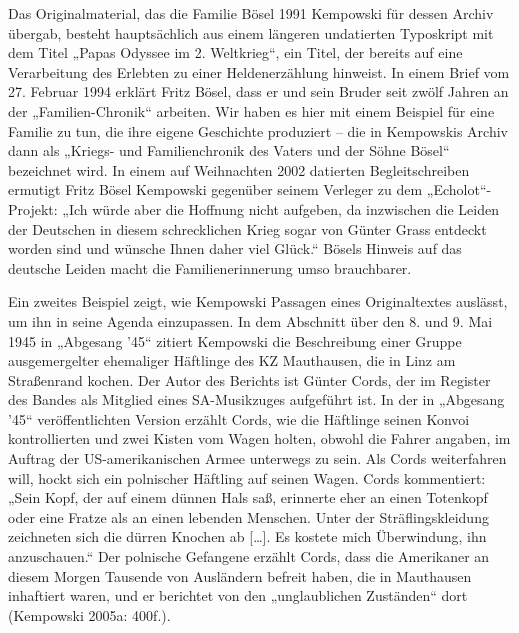 \begin{multicols*}{2}
Das Originalmaterial, das die Familie Bösel 1991 Kempowski für dessen Archiv übergab, besteht hauptsächlich aus einem längeren undatierten Typoskript mit dem Titel „Papas Odyssee im 2. Weltkrieg“, ein Titel, der bereits auf eine Verarbeitung des Erlebten zu einer Heldenerzählung hinweist. In einem Brief vom 27. Februar 1994 erklärt Fritz Bösel, dass er und sein Bruder seit zwölf Jahren an der „Familien-Chronik“ arbeiten. Wir haben es hier mit einem Beispiel für eine Familie zu tun, die ihre eigene Geschichte produziert – die in Kempowskis Archiv dann als „Kriegs- und Familienchronik des Vaters und der Söhne Bösel“ bezeichnet wird. In einem auf Weihnachten 2002 datierten Begleitschreiben ermutigt Fritz Bösel Kempowski gegenüber seinem Verleger zu dem „Echolot“-Projekt: „Ich würde aber die Hoffnung nicht aufgeben, da inzwischen die Leiden der Deutschen in diesem schrecklichen Krieg sogar von Günter Grass entdeckt worden sind und wünsche Ihnen daher viel Glück.“ Bösels Hinweis auf das deutsche Leiden macht die Familien­erinnerung umso brauchbarer.

Ein zweites Beispiel zeigt, wie Kempowski Passagen eines Originaltextes auslässt, um ihn in seine Agenda einzupassen. In dem Abschnitt über den 8. und 9. Mai 1945 in „Abgesang ’45“ zitiert Kempowski die Beschreibung einer Gruppe ausgemergelter ehemaliger Häftlinge des KZ Mauthausen, die in Linz am Straßenrand kochen. Der Autor des Berichts ist Günter Cords, der im Register des Bandes als Mitglied eines SA-Musikzuges aufgeführt ist. In der in „Abgesang ’45“ veröffentlichten Version erzählt Cords, wie die Häftlinge seinen Konvoi kontrollierten und zwei Kisten vom Wagen holten, obwohl die Fahrer angaben, im Auftrag der US-amerikanischen Armee unterwegs zu sein. Als Cords weiterfahren will, hockt sich ein polnischer Häftling auf seinen Wagen. Cords kommentiert: „Sein Kopf, der auf einem dünnen Hals saß, erinnerte eher an einen Totenkopf oder eine Fratze als an einen lebenden Menschen. Unter der Sträflingskleidung zeichneten sich die dürren Knochen ab […]. Es kostete mich Überwindung, ihn anzuschauen.“ Der polnische Gefangene erzählt Cords, dass die Amerikaner an diesem Morgen Tausende von Ausländern befreit haben, die in Mauthausen inhaftiert waren, und er berichtet von den „unglaublichen Zuständen“ dort (Kempowski 2005a: 400f.).


\end{multicols*}
